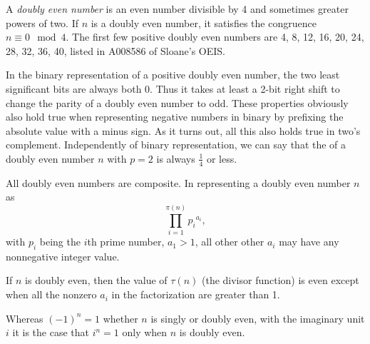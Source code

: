 \documentclass[12pt]{article}
\begin{document}
A {\em doubly even number} is an even number divisible by 4 and sometimes greater powers of two. If $n$ is a doubly even number, it satisfies the congruence $n \equiv 0 \mod 4$. The first few positive doubly even numbers are 4, 8, 12, 16, 20, 24, 28, 32, 36, 40, listed in A008586 of Sloane's OEIS.

In the binary representation of a positive doubly even number, the two least significant bits are always both 0. Thus it takes at least a 2-bit right shift to change the parity of a doubly even number to odd. These properties obviously also hold true when representing negative numbers in binary by prefixing the absolute value with a minus sign. As it turns out, all this also holds true in two's complement. Independently of binary representation, we can say that the  of a doubly even number $n$ with $p = 2$ is always $\frac{1}{4}$ or less.

All doubly even numbers are composite. In representing a doubly even number $n$ as $$\prod_{i = 1}^{\pi(n)} {p_i}^{a_i},$$ with $p_i$ being the $i$th prime number, $a_1 > 1$, all other other $a_i$ may have any nonnegative integer value.

If $n$ is doubly even, then the value of $\tau(n)$ (the divisor function) is even except when all the nonzero $a_i$ in the factorization are greater than 1. %

Whereas $(-1)^n = 1$ whether $n$ is singly or doubly even, with the imaginary unit $i$ it is the case that $i^n = 1$ only when $n$ is doubly even.

\end{document}
